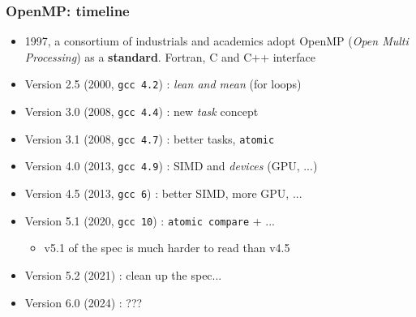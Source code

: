 \documentclass{beamer}
\begin{document}
\begin{frame}
  \frametitle{OpenMP: timeline}
  \begin{itemize}
  \item 1997, a consortium of industrials and academics adopt OpenMP ({\it Open
      Multi Processing}) as a \textbf{standard}. Fortran, C and C++
    interface

  \item Version 2.5 (2000, \texttt{gcc 4.2}) : \emph{lean and mean} (for loops)

  \item Version 3.0 (2008, \texttt{gcc 4.4}) : new \emph{task} concept 

  \item Version 3.1 (2008, \texttt{gcc 4.7}) : better tasks, \texttt{atomic}

  \item Version 4.0 (2013, \texttt{gcc 4.9}) : SIMD and \emph{devices} (GPU, ...)
    
  \item Version 4.5 (2013, \texttt{gcc 6}) : better SIMD, more GPU, ...
    
  \item Version 5.1 (2020, \texttt{gcc 10}) : \texttt{atomic compare} + ...
    \begin{itemize}
    \item v5.1 of the spec is much harder to read than v4.5
    \end{itemize}
  \item Version 5.2 (2021) : clean up the spec... 
  \item Version 6.0 (2024) : ???
  \end{itemize}
\end{frame}
\end{document}
